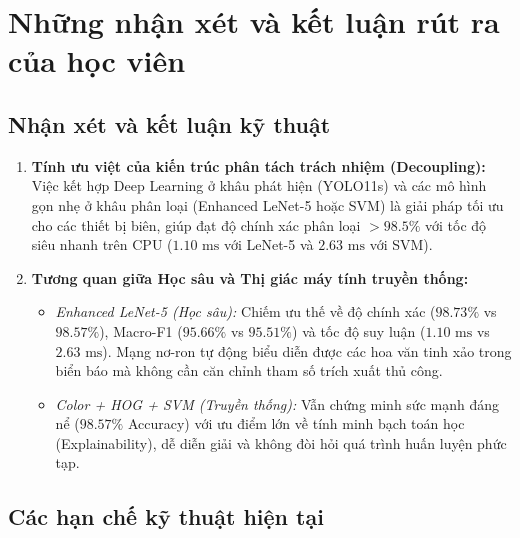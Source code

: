 \section{Những nhận xét và kết luận rút ra của học viên}
\label{sec:ket_luan}

\subsection{Nhận xét và kết luận kỹ thuật}
\label{subsec:nhan_xet_ky_thuat}

\begin{enumerate}
    \item \textbf{Tính ưu việt của kiến trúc phân tách trách nhiệm (Decoupling):} Việc kết hợp Deep Learning ở khâu phát hiện (YOLO11s) và các mô hình gọn nhẹ ở khâu phân loại (Enhanced LeNet-5 hoặc SVM) là giải pháp tối ưu cho các thiết bị biên, giúp đạt độ chính xác phân loại $> 98.5\%$ với tốc độ siêu nhanh trên CPU ($1.10\text{ ms}$ với LeNet-5 và $2.63\text{ ms}$ với SVM).
    \item \textbf{Tương quan giữa Học sâu và Thị giác máy tính truyền thống:}
    \begin{itemize}
        \item \textit{Enhanced LeNet-5 (Học sâu):} Chiếm ưu thế về độ chính xác ($98.73\%$ vs $98.57\%$), Macro-F1 ($95.66\%$ vs $95.51\%$) và tốc độ suy luận ($1.10\text{ ms}$ vs $2.63\text{ ms}$). Mạng nơ-ron tự động biểu diễn được các hoa văn tinh xảo trong biển báo mà không cần căn chỉnh tham số trích xuất thủ công.
        \item \textit{Color + HOG + SVM (Truyền thống):} Vẫn chứng minh sức mạnh đáng nể ($98.57\%$ Accuracy) với ưu điểm lớn về tính minh bạch toán học (Explainability), dễ diễn giải và không đòi hỏi quá trình huấn luyện phức tạp.
    \end{itemize}
\end{enumerate}

\subsection{Các hạn chế kỹ thuật hiện tại}
\label{subsec:han_che}

